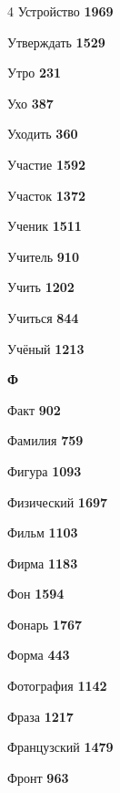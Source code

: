 \begin{multicols}{4}
\noindent Устройство \dotfill \textbf{\color{secondary} 1969}\par
\noindent Утверждать \dotfill \textbf{\color{secondary} 1529}\par
\noindent Утро \dotfill \textbf{\color{secondary} 231}\par
\noindent Ухо \dotfill \textbf{\color{secondary} 387}\par
\noindent Уходить \dotfill \textbf{\color{secondary} 360}\par
\noindent Участие \dotfill \textbf{\color{secondary} 1592}\par
\noindent Участок \dotfill \textbf{\color{secondary} 1372}\par
\noindent Ученик \dotfill \textbf{\color{secondary} 1511}\par
\noindent Учитель \dotfill \textbf{\color{secondary} 910}\par
\noindent Учить \dotfill \textbf{\color{secondary} 1202}\par
\noindent Учиться \dotfill \textbf{\color{secondary} 844}\par
\noindent Учёный \dotfill \textbf{\color{secondary} 1213}\par

\vspace{0.6em}\noindent\textbf{\normalsize\sffamily\color{primary} Ф}\par\vspace{0.2em}
\noindent Факт \dotfill \textbf{\color{secondary} 902}\par
\noindent Фамилия \dotfill \textbf{\color{secondary} 759}\par
\noindent Фигура \dotfill \textbf{\color{secondary} 1093}\par
\noindent Физический \dotfill \textbf{\color{secondary} 1697}\par
\noindent Фильм \dotfill \textbf{\color{secondary} 1103}\par
\noindent Фирма \dotfill \textbf{\color{secondary} 1183}\par
\noindent Фон \dotfill \textbf{\color{secondary} 1594}\par
\noindent Фонарь \dotfill \textbf{\color{secondary} 1767}\par
\noindent Форма \dotfill \textbf{\color{secondary} 443}\par
\noindent Фотография \dotfill \textbf{\color{secondary} 1142}\par
\noindent Фраза \dotfill \textbf{\color{secondary} 1217}\par
\noindent Французский \dotfill \textbf{\color{secondary} 1479}\par
\noindent Фронт \dotfill \textbf{\color{secondary} 963}\par


\end{multicols}
